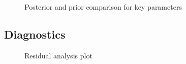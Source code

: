 \documentclass[
  letterpaper,
  DIV=11,
  numbers=noendperiod]{scrartcl}
\begin{document}
\begin{figure}[H]


\caption{\label{fig-post-prior}Posterior and prior comparison for key
parameters}

\end{figure}%

\subsection{Diagnostics}\label{diagnostics}

\begin{figure}[H]


\caption{\label{fig-residuals}Residual analysis plot}

\end{figure}%
\end{document}
